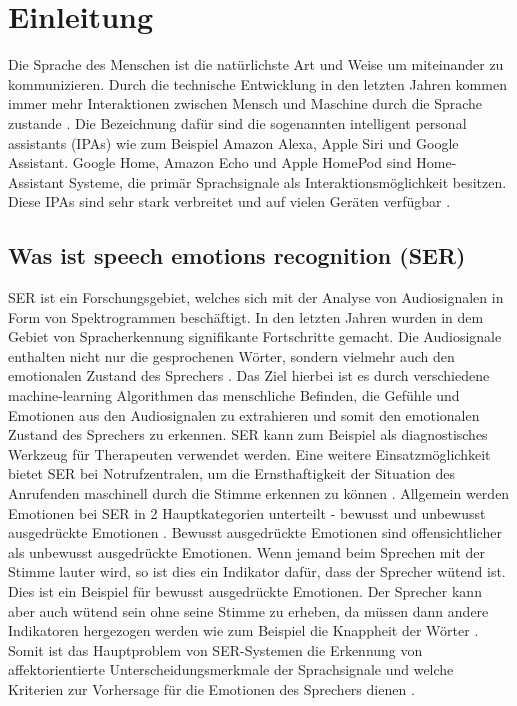 \chapter{Einleitung}

Die Sprache des Menschen ist die natürlichste Art und Weise um miteinander zu kommunizieren. Durch die technische Entwicklung in den letzten Jahren kommen immer mehr Interaktionen zwischen Mensch und Maschine durch die Sprache zustande \cite{badshah2019deep}. Die Bezeichnung dafür sind die sogenannten intelligent personal assistants (IPAs) wie zum Beispiel Amazon Alexa, Apple Siri und Google Assistant. Google Home, Amazon Echo und Apple HomePod sind Home-Assistant Systeme, die primär Sprachsignale als Interaktionsmöglichkeit besitzen. Diese IPAs sind sehr stark verbreitet und auf vielen Geräten verfügbar \cite{speech_in_hci}.


\section{Was ist speech emotions recognition (SER)}
SER ist ein Forschungsgebiet, welches sich mit der Analyse von Audiosignalen in Form von Spektrogrammen beschäftigt. In den letzten Jahren wurden in dem Gebiet von Spracherkennung signifikante Fortschritte gemacht. Die Audiosignale enthalten nicht nur die gesprochenen Wörter, sondern vielmehr auch den emotionalen Zustand des Sprechers \cite{badshah2019deep,speech_in_hci}. Das Ziel hierbei ist es durch verschiedene machine-learning Algorithmen das menschliche Befinden, die Gefühle und Emotionen aus den Audiosignalen zu extrahieren und somit den emotionalen Zustand des Sprechers zu erkennen. SER kann zum Beispiel als diagnostisches Werkzeug für Therapeuten verwendet werden. Eine weitere Einsatzmöglichkeit bietet SER bei Notrufzentralen, um die Ernsthaftigkeit der Situation des Anrufenden maschinell durch die Stimme erkennen zu können \cite{badshah2019deep}. Allgemein werden Emotionen bei SER in 2 Hauptkategorien unterteilt - bewusst und unbewusst ausgedrückte Emotionen \cite{elearning}. Bewusst ausgedrückte Emotionen sind offensichtlicher als unbewusst ausgedrückte Emotionen. Wenn jemand beim Sprechen mit der Stimme lauter wird, so ist dies ein Indikator dafür, dass der Sprecher wütend ist. Dies ist ein Beispiel für bewusst ausgedrückte Emotionen. Der Sprecher kann aber auch wütend sein ohne seine Stimme zu erheben, da müssen dann andere Indikatoren hergezogen werden wie zum Beispiel die Knappheit der Wörter \cite{elearning}. Somit ist das Hauptproblem von SER-Systemen die Erkennung von affektorientierte Unterscheidungsmerkmale der Sprachsignale und welche Kriterien zur Vorhersage für die Emotionen des Sprechers dienen \cite{badshah2019deep}.

